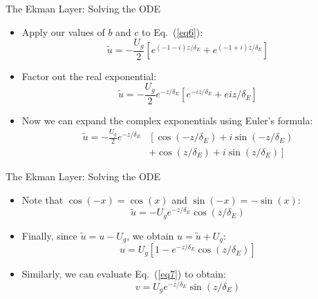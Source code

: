 \begin{frame}{The Ekman Layer: Solving the ODE}

\begin{itemize}
	\item Apply our values of $b$ and $c$ to Eq.~(\ref{eq6}):
	$$\tilde u = -\frac{U_g}{2} \left[ e^{(-1-i)z/\delta_E} + e^{(-1+i)z/\delta_E}\right]$$
	\item Factor out the real exponential:
	$$\tilde u = -\frac{U_g}{2} e^{-z/\delta_E} \left[e^{-iz/\delta_E} + e{iz/\delta_E}\right]$$
	\item Now we can expand the complex exponentials using Euler's formula:
	\begin{align*}
	\tilde u = -\frac{U_g}{2} e^{-z/\delta_E}&\left[\cos(-z/\delta_E) + i\sin(-z/\delta_E) \right. \\& \left. + \cos(z/\delta_E) + i\sin(z/\delta_E)\right]
	\end{align*}
\end{itemize}
\end{frame}
\begin{frame}{The Ekman Layer: Solving the ODE}

\begin{itemize}
	\item Note that $\cos(-x)=\cos(x)$ and $\sin(-x) = -\sin(x)$:
	$$\tilde u = -U_g e^{-z/\delta_E} \cos(z/\delta_E)$$
	\item Finally, since $\tilde u = u-U_g$, we obtain $u=\tilde u + U_g$:
	\begin{equation}
		\boxed{u = U_g\left[1 - e^{-z/\delta_E}\cos(z/\delta_E)\right]}
	\end{equation}
	\item Similarly, we can evaluate Eq.~(\ref{eq7}) to obtain:
	\begin{equation}
		\boxed{v = U_g e^{-z/\delta_E}\sin(z/\delta_E)}
	\end{equation}
\end{itemize}
\end{frame}
